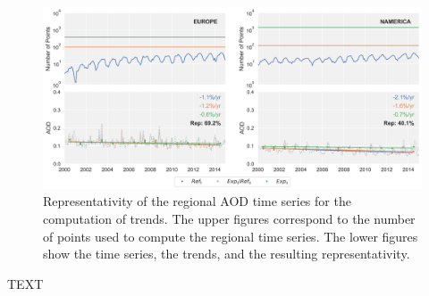 \documentclass[journal abbreviation, manuscript]{copernicus}
\begin{document}
\begin{figure}[t]
 \includegraphics[width=16cm]{../scripts/figs/representativity-od550aer.png}
 \caption{Representativity of the regional AOD time series for the computation of trends. The upper figures correspond to the number of points used to compute the regional time series. The lower figures show the time series, the trends, and the resulting representativity.}
 \label{fig:representativity}
\end{figure}

\appendixfigures  %

\appendixtables   %







\begin{acknowledgements}
 TEXT
\end{acknowledgements}









\end{document}
